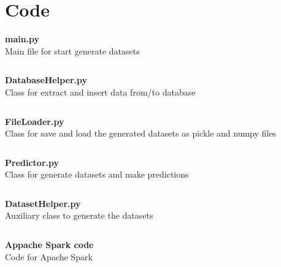 \chapter{Code}

\textbf{\Large main.py}\\

Main file for start generate datasets
\inputminted[mathescape,
               linenos,
               numbersep=5pt,
               gobble=2,
               frame=lines,
               framesep=2mm]{python}{../tools/main.py}

\textbf{\Large DatabaseHelper.py}\\

Class for extract and insert data from/to database 
\inputminted[mathescape,
               linenos,
               numbersep=5pt,
               gobble=2,
               frame=lines,
               framesep=2mm]{python}{../tools/DatasetHelper.py}

\textbf{\Large FileLoader.py}\\

Class for save and load the generated datasets as pickle and numpy files 
\inputminted[mathescape,
               linenos,
               numbersep=5pt,
               gobble=2,
               frame=lines,
               framesep=2mm]{python}{../tools/FileLoader.py}

\textbf{\Large Predictor.py}\\

Class for generate datasets and make predictions
\inputminted[mathescape,
               linenos,
               numbersep=5pt,
               gobble=2,
               frame=lines,
               framesep=2mm]{python}{../tools/Predictor.py}

\textbf{\Large DatasetHelper.py}\\

Auxiliary class to generate the datasets
\inputminted[mathescape,
               linenos,
               numbersep=5pt,
               gobble=2,
               frame=lines,
               framesep=2mm]{python}{../tools/DatasetHelper.py}

\textbf{\Large Appache Spark code}\\

Code for Apache Spark
\inputminted[mathescape,
               linenos,
               numbersep=5pt,
               gobble=2,
               frame=lines,
               framesep=2mm]{python}{../tools/template_new.py}

